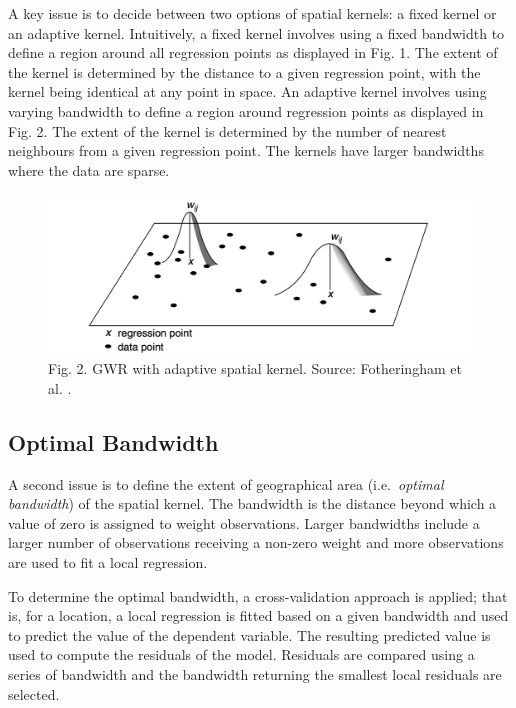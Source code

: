 \documentclass[
]{book}
\begin{document}
A key issue is to decide between two options of spatial kernels: a fixed kernel or an adaptive kernel. Intuitively, a fixed kernel involves using a fixed bandwidth to define a region around all regression points as displayed in Fig. 1. The extent of the kernel is determined by the distance to a given regression point, with the kernel being identical at any point in space. An adaptive kernel involves using varying bandwidth to define a region around regression points as displayed in Fig. 2. The extent of the kernel is determined by the number of nearest neighbours from a given regression point. The kernels have larger bandwidths where the data are sparse.

\begin{figure}
\centering
\includegraphics{figs/ch8/adaptive_bandwidth.png}
\caption{Fig. 2. GWR with adaptive spatial kernel. Source: Fotheringham et al. \citeyearpar[p.47]{Fotheringham_et_al_2002_book}.}
\end{figure}

\hypertarget{optimal-bandwidth}{%
\subsection{Optimal Bandwidth}\label{optimal-bandwidth}}

A second issue is to define the extent of geographical area (i.e.~\emph{optimal bandwidth}) of the spatial kernel. The bandwidth is the distance beyond which a value of zero is assigned to weight observations. Larger bandwidths include a larger number of observations receiving a non-zero weight and more observations are used to fit a local regression.

To determine the optimal bandwidth, a cross-validation approach is applied; that is, for a location, a local regression is fitted based on a given bandwidth and used to predict the value of the dependent variable. The resulting predicted value is used to compute the residuals of the model. Residuals are compared using a series of bandwidth and the bandwidth returning the smallest local residuals are selected.
\end{document}

